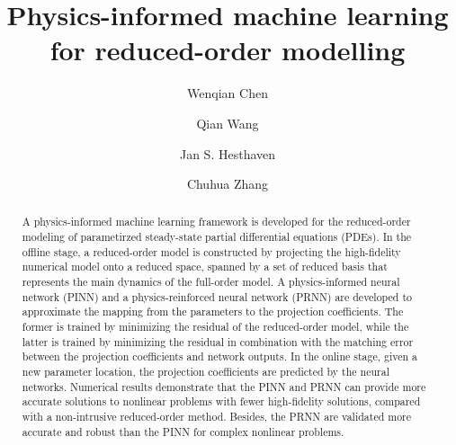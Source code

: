 \documentclass[preprint, 10pt]{elsarticle}
\begin{document}
	
\begin{frontmatter}



\title{Physics-informed machine learning for reduced-order modelling }


\author[XJTU]{Wenqian Chen}
\author[EPFL]{Qian Wang}
\author[EPFL]{Jan S. Hesthaven}
\author[XJTU]{Chuhua Zhang}
\address[XJTU]{Department of Fluid Machinery and Engineering, School of Energy and Power Engineering, Xi'an Jiaotong University, Xi'an, Shaanxi, People's Republic of China}
\address[EPFL]{Chair of Computational Mathematics and Simulation Science, \'Ecole polytechnique f\'ed\'erale de Lausanne, 1015 Lausanne, Switzerland}

\begin{abstract}
  \hspace{8pt} A physics-informed machine learning framework is developed for the reduced-order modeling of parametirzed steady-state partial differential equations (PDEs). In the offline stage, a reduced-order model is constructed by projecting the high-fidelity numerical model onto a reduced space, spanned by a set of reduced basis that represents the main dynamics of the full-order model. A physics-informed neural network (PINN) and a physics-reinforced neural network (PRNN) are developed to approximate the mapping from the parameters to the projection coefficients. The former is trained by minimizing the residual of the reduced-order model, while the latter is trained by minimizing the residual in combination with the matching error between  the projection coefficients and network outputs. In the online stage, given a new parameter location, the projection coefficients are predicted by the neural networks. Numerical results demonstrate that the PINN and PRNN can provide more accurate solutions to nonlinear problems with fewer high-fidelity solutions, compared with a non-intrusive reduced-order method. Besides, the PRNN are validated more accurate and robust than the PINN for complex nonlinear problems.


\end{abstract}
\end{frontmatter}
\end{document}

